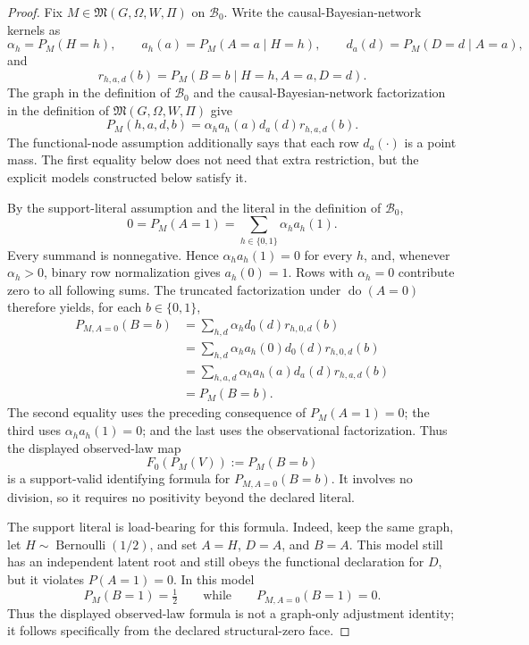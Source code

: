 \documentclass{article}
\begin{document}
\begin{proof}
Fix \(M\in\mathfrak M(G,\Omega,W,\Pi)\) on \(\mathcal B_0\).  Write the causal-Bayesian-network kernels as
\[
 \alpha_h=P_M(H=h),\qquad
 a_h(a)=P_M(A=a\mid H=h),\qquad
 d_a(d)=P_M(D=d\mid A=a),
\]
and
\[
 r_{h,a,d}(b)=P_M(B=b\mid H=h,A=a,D=d).
\]
The graph in the definition of \(\mathcal B_0\) and the causal-Bayesian-network factorization in the definition of \(\mathfrak M(G,\Omega,W,\Pi)\) give
\[
 P_M(h,a,d,b)=\alpha_h a_h(a)d_a(d)r_{h,a,d}(b).
\]
The functional-node assumption additionally says that each row \(d_a(\cdot)\) is a point mass.  The first equality below does not need that extra restriction, but the explicit models constructed below satisfy it.

By the support-literal assumption and the literal in the definition of \(\mathcal B_0\),
\[
 0=P_M(A=1)=\sum_{h\in\{0,1\}}\alpha_h a_h(1).
\]
Every summand is nonnegative.  Hence \(\alpha_h a_h(1)=0\) for every \(h\), and, whenever \(\alpha_h>0\), binary row normalization gives \(a_h(0)=1\).  Rows with \(\alpha_h=0\) contribute zero to all following sums.  The truncated factorization under \(\operatorname{do}(A=0)\) therefore yields, for each \(b\in\{0,1\}\),
\[
\begin{aligned}
 P_{M,A=0}(B=b)
 &=\sum_{h,d}\alpha_h d_0(d)r_{h,0,d}(b)\\
 &=\sum_{h,d}\alpha_h a_h(0)d_0(d)r_{h,0,d}(b)\\
 &=\sum_{h,a,d}\alpha_h a_h(a)d_a(d)r_{h,a,d}(b)\\
 &=P_M(B=b).
\end{aligned}
\]
The second equality uses the preceding consequence of \(P_M(A=1)=0\); the third uses \(\alpha_h a_h(1)=0\); and the last uses the observational factorization.  Thus the displayed observed-law map
\[
 F_0(P_M(V)):=P_M(B=b)
\]
is a support-valid identifying formula for \(P_{M,A=0}(B=b)\).  It involves no division, so it requires no positivity beyond the declared literal.

The support literal is load-bearing for this formula.  Indeed, keep the same graph, let \(H\sim\operatorname{Bernoulli}(1/2)\), and set \(A=H\), \(D=A\), and \(B=A\).  This model still has an independent latent root and still obeys the functional declaration for \(D\), but it violates \(P(A=1)=0\).  In this model
\[
 P_M(B=1)=\tfrac12
 \qquad\text{while}\qquad
 P_{M,A=0}(B=1)=0.
\]
Thus the displayed observed-law formula is not a graph-only adjustment identity; it follows specifically from the declared structural-zero face.


\end{proof}
\end{document}
